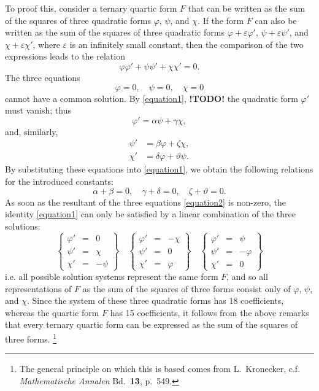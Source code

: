 \documentclass{article}
\newcommand{\todo}{\textbf{ !TODO! }}
\newcommand{\oldpage}[1]{\marginpar{\footnotesize$\Big\vert$ \textit{p.~#1}}}
\begin{document}
To proof this, consider a ternary quartic form $F$ that can be written as the sum of the squares of three quadratic forms $\varphi$, $\psi$, and $\chi$.
If the form $F$ can also be written as the sum of the squares of three quadratic forms $\varphi+\varepsilon\varphi'$, $\psi+\varepsilon\psi'$, and $\chi+\varepsilon\chi'$, where $\varepsilon$ is an infinitely small constant, then the comparison of the two expressions leads to the relation
\[
\label{equation1}
  \varphi\varphi' + \psi\psi' + \chi\chi' = 0.
  \tag{1}
\]
The three equations
\[
\label{equation2}
  \varphi=0,
  \quad\psi=0,
  \quad\chi=0
  \tag{2}
\]
cannot have a common solution.
By \cref{equation1}, \todo
\oldpage{343}
the quadratic form $\varphi'$ must vanish;
thus
\[
  \varphi' = \alpha\psi+\gamma\chi,
\]
and, similarly,
\begin{align*}
  \psi' &= \beta\varphi+\zeta\chi,
\\\chi' &= \delta\varphi+\vartheta\psi.
\end{align*}
By substituting these equations into \cref{equation1}, we obtain the following relations for the introduced constants:
\[
  \alpha+\beta = 0,
  \quad\gamma+\delta = 0,
  \quad\zeta+\vartheta = 0.
\]
As soon as the resultant of the three equations \cref{equation2} is non-zero, the identity \cref{equation1} can only be satisfied by a linear combination of the three solutions:
\[
  \left\{
    \begin{array}{rcr}
      \varphi' &= &0
    \\\psi' &= &\chi
    \\\chi' &= &-\psi
    \end{array}
  \right\}
  \quad
  \left\{
    \begin{array}{rcr}
      \varphi' &= &-\chi
    \\\psi' &= &0
    \\\chi' &= &\varphi
    \end{array}
  \right\}
  \quad
  \left\{
    \begin{array}{rcr}
      \varphi' &= &\psi
    \\\psi' &= &-\varphi
    \\\chi' &= &0
    \end{array}
  \right\}
\]
i.e. all possible solution systems represent the same form $F$, and so all representations of $F$ as the sum of the squares of three forms consist only of $\varphi$, $\psi$, and $\chi$.
Since the system of these three quadratic forms has 18 coefficients, whereas the quartic form $F$ has 15 coefficients, it follows from the above remarks that every ternary quartic form can be expressed as the sum of the squares of three forms.
\footnote{The general principle on which this is based comes from L.~Kronecker, c.f. \emph{Mathematische Annalen} Bd.~\textbf{13}, p.~549.}



\nocite{*}

\end{document}
